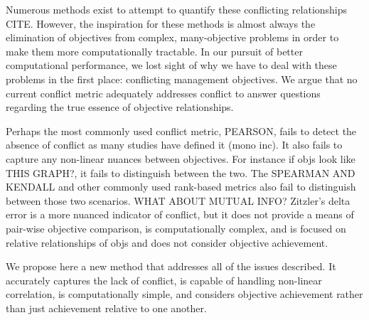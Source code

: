 Numerous methods exist to attempt to quantify these conflicting relationships CITE. However, the inspiration for these methods is almost always the elimination of objectives from complex, many-objective problems in order to make them more computationally tractable. In our pursuit of better computational performance, we lost sight of why we have to deal with these problems in the first place: conflicting management objectives. We argue that no current conflict metric adequately addresses conflict to answer questions regarding the true essence of objective relationships.

Perhaps the most commonly used conflict metric, PEARSON, fails to detect the absence of conflict as many studies have defined it (mono inc). It also fails to capture any non-linear nuances between objectives. For instance if objs look like THIS GRAPH?, it fails to distinguish between the two. The SPEARMAN AND KENDALL and other commonly used rank-based metrics also fail to distinguish between those two scenarios. WHAT ABOUT MUTUAL INFO? Zitzler's delta error is a more nuanced indicator of conflict, but it does not provide a means of pair-wise objective comparison, is computationally complex, and is focused on relative relationships of objs and does not consider objective achievement.

We propose here a new method that addresses all of the issues described. It accurately captures the lack of conflict, is capable of handling non-linear correlation, is computationally simple, and considers objective achievement rather than just achievement relative to one another.

